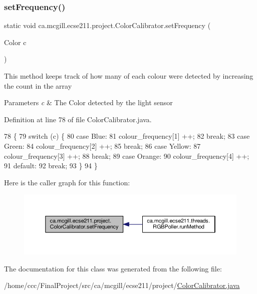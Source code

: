 \subsubsection{\texorpdfstring{set\+Frequency()}{setFrequency()}}
{\footnotesize\ttfamily static void ca.\+mcgill.\+ecse211.\+project.\+Color\+Calibrator.\+set\+Frequency (\begin{DoxyParamCaption}\item[{Color}]{c }\end{DoxyParamCaption})\hspace{0.3cm}{\ttfamily [static]}}

This method keeps track of how many of each colour were detected by increasing the count in the array 
\begin{DoxyParams}{Parameters}
{\em c} & The Color detected by the light sensor \\
\hline
\end{DoxyParams}


Definition at line 78 of file Color\+Calibrator.\+java.


\begin{DoxyCode}
78                                            \{
79     \textcolor{keywordflow}{switch} (c) \{
80       \textcolor{keywordflow}{case} Blue:
81         colour\_frequency[1] ++;
82         \textcolor{keywordflow}{break};
83       \textcolor{keywordflow}{case} Green:
84         colour\_frequency[2] ++;
85         \textcolor{keywordflow}{break};
86       \textcolor{keywordflow}{case} Yellow:
87         colour\_frequency[3] ++;
88         \textcolor{keywordflow}{break};
89       \textcolor{keywordflow}{case} Orange:
90         colour\_frequency[4] ++;
91       \textcolor{keywordflow}{default}:
92         \textcolor{keywordflow}{break};
93     \}
94   \}
\end{DoxyCode}
Here is the caller graph for this function\+:
\nopagebreak
\begin{figure}[H]
\begin{center}
\leavevmode
\includegraphics[width=350pt]{classca_1_1mcgill_1_1ecse211_1_1project_1_1_color_calibrator_a40906193773ead0bfd582f188413c97a_icgraph}
\end{center}
\end{figure}


The documentation for this class was generated from the following file\+:\begin{DoxyCompactItemize}
\item 
/home/ccc/\+Final\+Project/src/ca/mcgill/ecse211/project/\hyperlink{_color_calibrator_8java}{Color\+Calibrator.\+java}\end{DoxyCompactItemize}
